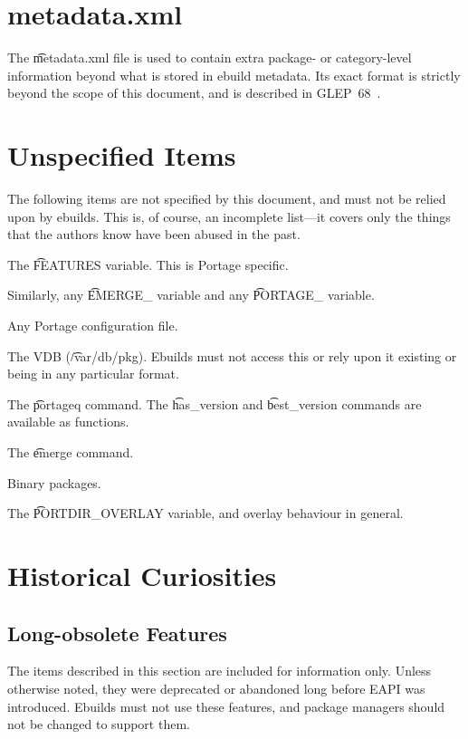 \chapter{metadata.xml}
\label{ch:metadata-xml}

The \t{metadata.xml} file is used to contain extra package- or category-level information beyond
what is stored in ebuild metadata. Its exact format is strictly beyond the scope of this document,
and is described in GLEP~68~\cite{Glep68}.

\chapter{Unspecified Items}

The following items are not specified by this document, and must not be relied upon by ebuilds.
This is, of course, an incomplete list---it covers only the things that the authors know have
been abused in the past.

\begin{compactitem}
\item The \t{FEATURES} variable. This is Portage specific.
\item Similarly, any \t{EMERGE_} variable and any \t{PORTAGE_} variable.
\item Any Portage configuration file.
\item The VDB (\t{/var/db/pkg}). Ebuilds must not access this or rely upon it existing or being
    in any particular format.
\item The \t{portageq} command. The \t{has_version} and \t{best_version} commands are
    available as functions.
\item The \t{emerge} command.
\item Binary packages.
\item The \t{PORTDIR_OVERLAY} variable, and overlay behaviour in general.
\end{compactitem}

\chapter{Historical Curiosities}

\section{Long-obsolete Features}

The items described in this section are included for information only. Unless otherwise noted, they
were deprecated or abandoned long before EAPI was introduced. Ebuilds must not use these features,
and package managers should not be changed to support them.

